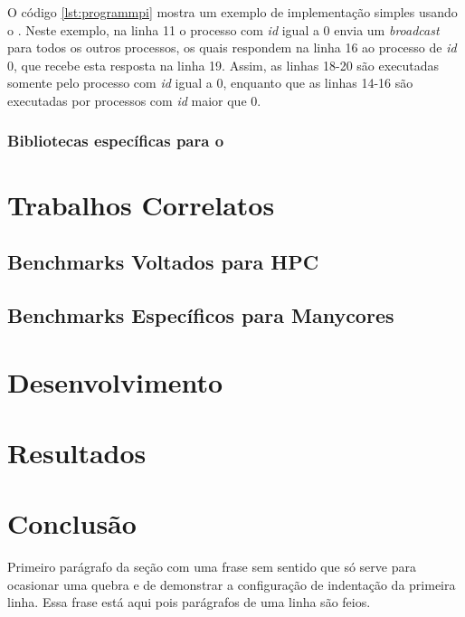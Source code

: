 O código \ref{lst:programmpi} mostra um exemplo de implementação simples usando o \MPI. Neste exemplo, na linha 11 o processo com \textit{id} igual a 0 envia um \textit{broadcast} para todos os outros processos, os quais respondem na linha 16 ao processo de \textit{id} 0, que recebe esta resposta na linha 19. Assim, as linhas 18-20 são executadas somente pelo processo com \textit{id} igual a 0, enquanto que as linhas 14-16 são executadas por processos com \textit{id} maior que 0. 

\subsection{Bibliotecas específicas para o \mppa}
\label{sec:bibliotecasespecificasmppa}

\chapter{Trabalhos Correlatos}
\label{ch:trabcorrelatos}


\section{Benchmarks Voltados para HPC}
\label{sec:benchprahpc}

\section{Benchmarks Específicos para Manycores}
\label{sec:benchpramanycores}

\chapter{Desenvolvimento}
\label{ch:desenvolvimento}

\chapter{Resultados}
\label{ch:resultados}

\chapter{Conclusão}
\label{ch:conclusao}

 Primeiro parágrafo da seção com uma frase sem sentido que só serve para ocasionar uma quebra e de demonstrar a configuração de indentação da primeira linha. Essa frase está aqui pois parágrafos de uma linha são feios.

